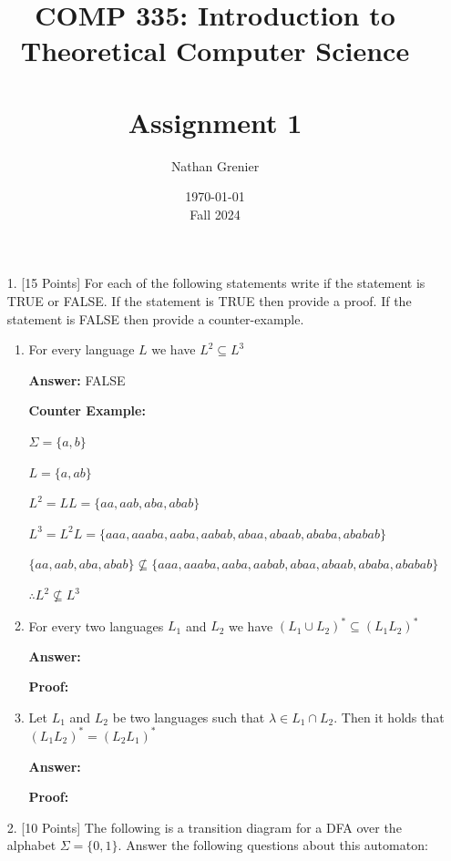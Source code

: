 \documentclass[12pt]{article}
\title{COMP 335: Introduction to Theoretical Computer Science\\
\ \\
Assignment 1}
\author{Nathan Grenier}
\date{\today \\ Fall 2024}
\begin{document}
\maketitle

\newpage

\begin{enumerate}

	\item[1.] [15 Points] For each of the following statements write if the statement is TRUE or FALSE. If the statement is TRUE then provide a proof. If the statement is FALSE then provide a counter-example.

	      \begin{enumerate}

		      \item For every language $L$ we have $L^2 \subseteq L^3$

		            \noindent \textbf{Answer:} FALSE

		            \noindent \textbf{Counter Example:}

		            $\Sigma = \{a,b \}$

		            $L=\{a, ab \}$

		            $L^2=LL=\{aa, aab, aba, abab \}$

		            $L^3=L^2L=\{aaa, aaaba, aaba, aabab, abaa, abaab, ababa, ababab \}$

		            $\{aa, aab, aba, abab \} \not\subseteq \{aaa, aaaba, aaba, aabab, abaa, abaab, ababa, ababab \}$

		            $\therefore L^2 \not\subseteq L^3$


		      \item For every two languages $L_1$ and $L_2$ we have $(L_1 \cup L_2)^* \subseteq (L_1L_2)^*$

		            \noindent \textbf{Answer:}

		            \noindent \textbf{Proof:}

		      \item Let $L_1$ and $L_2$ be two languages such that $\lambda \in L_1 \cap L_2$. Then it holds that $(L_1L_2)^* = (L_2L_1)^*$

		            \noindent \textbf{Answer:}

		            \noindent \textbf{Proof:}

	      \end{enumerate}

	      \newpage

	\item[2.] [10 Points] The following is a transition diagram for a DFA over the alphabet $\Sigma = \{0,1\}$. Answer the following questions about this automaton:


\end{enumerate}
\end{document}
